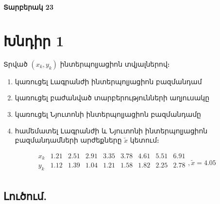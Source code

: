 \documentclass{article}
\begin{document}
\begin{center}
\textbf{Տարբերակ 23}
\end{center}

\section*{Խնդիր 1}

Տրված $\left(x_{k}, y_{k}\right)$ ինտերպոլյացիոն տվյալներով։

\begin{enumerate}

\item	կառուցել Լագրանժի ինտերպոլյացիոն բազմանդամ
\item        կառուցել բաժանված տարբերությունների աղյուսակը
\item        կառուցել Նյուտոնի ինտերպոլյացիոն բազմանդամը
\item        համեմատել Լագրանժի և Նյուտոնի ինտերպոլյացիոն բազմանդամների արժեքները $\tilde{x}$ կետում։

\end{enumerate}

$$
\begin{array}{c|c|c|c|c|c|c|c|c}
		x_{k}	&	1.21		&	2.51		&	2.91		&	3.35		&	3.78		&	4.61		&	5.51		&	6.91  \\ \hline
 		y_{k}	&	1.12		&	1.39		&	1.04		&	1.21		&	1.58		&	1.82		&	2.25		&	2.78	 \\
\end{array},  \tilde{x} = 4.05
$$


\subsection*{Լուծում.}
\end{document}
